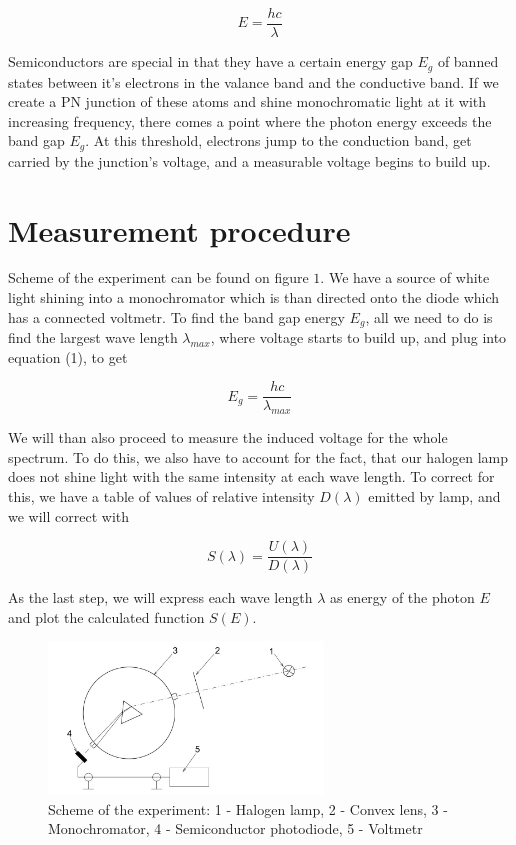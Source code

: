 \documentclass[a4paper,11pt]{article}
\begin{document}
\begin{equation}
    E = \frac{h c}{\lambda}
\end{equation}

Semiconductors are special in that they have a certain energy gap $ E_g $ of banned states between it's electrons in the valance band and the conductive band. If we create a PN junction of these atoms and shine monochromatic light at it with increasing frequency, there comes a point where the photon energy exceeds the band gap $ E_g $. At this threshold, electrons jump to the conduction band, get carried by the junction's voltage, and a measurable voltage begins to build up.
 
\section{Measurement procedure}

Scheme of the experiment can be found on figure $ 1 $. We have a source of white light shining into a monochromator which is than directed onto the diode which has a connected voltmetr. To find the band gap energy $ E_g $, all we need to do is find the largest wave length $ \lambda_{max} $, where voltage starts to build up, and plug into equation (1), to get

\begin{equation}
E_{g} = \frac{h c}{\lambda_{max}}
\end{equation}

\vspace{10pt}

We will than also proceed to measure the induced voltage for the whole spectrum. To do this, we also have to account for the fact, that our halogen lamp does not shine light with the same intensity at each wave length. To correct for this, we have a table of values of relative intensity $ D(\lambda) $  emitted by lamp, and we will correct with

\begin{equation}
 S(\lambda) = \frac{U(\lambda)}{ D(\lambda) }
\end{equation}

As the last step, we will express each wave length $ \lambda $ as energy of the photon $ E $ and plot the calculated function $ S(E) $.



\begin{figure}[htpb]
    \centering
    \includegraphics[width=0.65\textwidth]{aparatura.jpg}
    \caption{Scheme of the experiment: 1 - Halogen lamp, 2 - Convex lens, 3 - Monochromator, 4 - Semiconductor photodiode, 5 - Voltmetr}
\end{figure}
\end{document}
